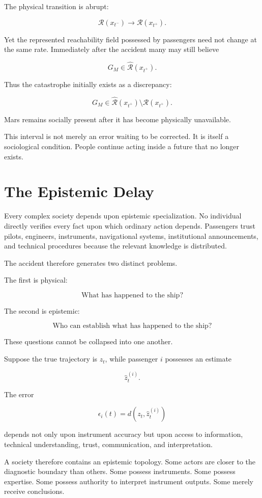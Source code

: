 \documentclass[11pt,oneside]{book}
\theoremstyle{definition}
\theoremstyle{remark}
\newcommand{\R}{\mathcal{R}}
\begin{document}
The physical transition is abrupt:

\[
\R(x_{t^-})
\rightarrow
\R(x_{t^+}).
\]

Yet the represented reachability field possessed by passengers need not change at the same rate. Immediately after the accident many may still believe

\[
G_M\in\widehat{\R}(x_{t^+}).
\]

Thus the catastrophe initially exists as a discrepancy:

\[
G_M
\in
\widehat{\R}(x_{t^+})
\setminus
\R(x_{t^+}).
\]

Mars remains socially present after it has become physically unavailable.

This interval is not merely an error waiting to be corrected. It is itself a sociological condition. People continue acting inside a future that no longer exists.

\section{The Epistemic Delay}

Every complex society depends upon epistemic specialization. No individual directly verifies every fact upon which ordinary action depends. Passengers trust pilots, engineers, instruments, navigational systems, institutional announcements, and technical procedures because the relevant knowledge is distributed.

The accident therefore generates two distinct problems.

The first is physical:

\[
\text{What has happened to the ship?}
\]

The second is epistemic:

\[
\text{Who can establish what has happened to the ship?}
\]

These questions cannot be collapsed into one another.

Suppose the true trajectory is \(z_t\), while passenger \(i\) possesses an estimate

\[
\hat z_t^{(i)}.
\]

The error

\[
\epsilon_i(t)
=
d\!\left(
z_t,
\hat z_t^{(i)}
\right)
\]

depends not only upon instrument accuracy but upon access to information, technical understanding, trust, communication, and interpretation.

A society therefore contains an epistemic topology. Some actors are closer to the diagnostic boundary than others. Some possess instruments. Some possess expertise. Some possess authority to interpret instrument outputs. Some merely receive conclusions.
\end{document}
